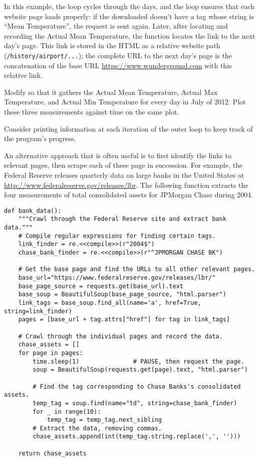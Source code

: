In this example, the  loop cycles through the days, and the  loop ensures that each website page loads properly: if the downloaded  doesn't have a tag whose string is ``Mean Temperature'', the request is sent again.
Later, after locating and recording the Actual Mean Temperature, the function locates the link to the next day's page.
This link is stored in the HTML as a relative website path (\texttt{/history/airport/...}); the complete URL to the next day's page is the concatenation of the base URL \url{https://www.wunderground.com} with this relative link.

\begin{problem} %
Modify  so that it gathers the Actual Mean Temperature, Actual Max Temperature, and Actual Min Temperature for every day in July of 2012.
Plot these three measurements against time on the same plot.

Consider printing information at each iteration of the outer loop to keep track of the program's progress.
\end{problem}

An alternative approach that is often useful is to first identify the links to relevant pages, then scrape each of these page in succession.
For example, the Federal Reserve releases quarterly data on large banks in the United States at \url{http://www.federalreserve.gov/releases/lbr}.
The following function extracts the four measurements of total consolidated assets for JPMorgan Chase during 2004.

\begin{lstlisting}
def bank_data():
    """Crawl through the Federal Reserve site and extract bank data."""
    # Compile regular expressions for finding certain tags.
    link_finder = re.<<compile>>(r"2004$")
    chase_bank_finder = re.<<compile>>(r"^JPMORGAN CHASE BK")

    # Get the base page and find the URLs to all other relevant pages.
    base_url="https://www.federalreserve.gov/releases/lbr/"
    base_page_source = requests.get(base_url).text
    base_soup = BeautifulSoup(base_page_source, "html.parser")
    link_tags = base_soup.find_all(name='a', href=True, string=link_finder)
    pages = [base_url + tag.attrs["href"] for tag in link_tags]

    # Crawl through the individual pages and record the data.
    chase_assets = []
    for page in pages:
        time.sleep(1)               # PAUSE, then request the page.
        soup = BeautifulSoup(requests.get(page).text, "html.parser")

        # Find the tag corresponding to Chase Banks's consolidated assets.
        temp_tag = soup.find(name="td", string=chase_bank_finder)
        for _ in range(10):
            temp_tag = temp_tag.next_sibling
        # Extract the data, removing commas.
        chase_assets.append(int(temp_tag.string.replace(',', '')))

    return chase_assets
\end{lstlisting}

